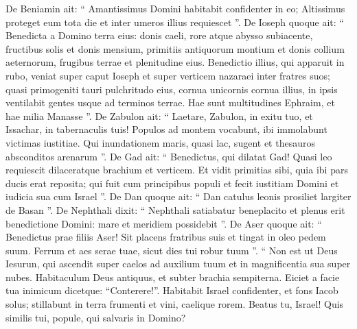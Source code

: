 \begin{biblechapter}
\begin{biblechapter}
\begin{biblechapter}
\begin{biblechapter}
\begin{biblechapter}
\begin{biblechapter}
\begin{biblechapter}
\begin{biblechapter}
\begin{biblechapter}
\begin{biblechapter}
\begin{biblechapter}
\begin{biblechapter}
\begin{biblechapter}
\begin{biblechapter}
\begin{biblechapter}
\begin{biblechapter}
\begin{biblechapter}
\begin{biblechapter}
\begin{biblechapter}
\begin{biblechapter}
\begin{biblechapter}
\begin{biblechapter}
\begin{biblechapter}
\begin{biblechapter}
\begin{biblechapter}
\begin{biblechapter}
\begin{biblechapter}
\begin{biblechapter}
\begin{biblechapter}
\begin{biblechapter}
\begin{biblechapter}
\begin{biblechapter}
\begin{biblechapter}
 \verse De Beniamin ait:
 “ Amantissimus Domini
 habitabit confidenter in eo;
 Altissimus proteget eum tota die
 et inter umeros illius requiescet ”.
 \verse De Ioseph quoque ait:
 “ Benedicta a Domino terra eius:
 donis caeli, rore
 atque abysso subiacente,
 \verse fructibus solis
 et donis mensium,
 \verse primitiis antiquorum montium
 et donis collium aeternorum,
 \verse frugibus terrae et plenitudine eius.
 Benedictio illius, qui apparuit in rubo,
 veniat super caput Ioseph
 et super verticem nazaraei inter fratres suos;
 \verse quasi primogeniti tauri pulchritudo eius,
 cornua unicornis cornua illius,
 in ipsis ventilabit gentes
 usque ad terminos terrae.
 Hae sunt multitudines Ephraim,
 et hae milia Manasse ”.
 \verse De Zabulon ait:
 “ Laetare, Zabulon, in exitu tuo,
 et Issachar, in tabernaculis tuis!
 \verse Populos ad montem vocabunt,
 ibi immolabunt victimas iustitiae.
 Qui inundationem maris, quasi lac, sugent
 et thesauros absconditos arenarum ”.
 \verse De Gad ait:
 “ Benedictus, qui dilatat Gad!
 Quasi leo requiescit
 dilaceratque brachium et verticem.
 \verse Et vidit primitias sibi,
 quia ibi pars ducis erat reposita;
 qui fuit cum principibus populi
 et fecit iustitiam Domini
 et iudicia sua cum Israel ”.
 \verse De Dan quoque ait:
 “ Dan catulus leonis
 prosiliet largiter de Basan ”.
 \verse De Nephthali dixit:
 “ Nephthali satiabatur beneplacito
 et plenus erit benedictione Domini:
 mare et meridiem possidebit ”.
 \verse De Aser quoque ait:
 “ Benedictus prae filiis Aser!
 Sit placens fratribus suis
 et tingat in oleo pedem suum.
 \verse Ferrum et aes serae tuae,
 sicut dies tui robur tuum ”.
 \verse “ Non est ut Deus Iesurun,
 qui ascendit super caelos ad auxilium tuum
 et in magnificentia sua super nubes.
 \verse Habitaculum Deus antiquus,
 et subter brachia sempiterna.
 Eiciet a facie tua inimicum
 dicetque: “Conterere!”.
 \verse Habitabit Israel confidenter,
 et fons Iacob solus;
 stillabunt in terra frumenti et vini,
 caelique rorem.
 \verse Beatus tu, Israel! Quis similis tui,
 popule, qui salvaris in Domino?

\end{biblechapter}
\end{biblechapter}
\end{biblechapter}
\end{biblechapter}
\end{biblechapter}
\end{biblechapter}
\end{biblechapter}
\end{biblechapter}
\end{biblechapter}
\end{biblechapter}
\end{biblechapter}
\end{biblechapter}
\end{biblechapter}
\end{biblechapter}
\end{biblechapter}
\end{biblechapter}
\end{biblechapter}
\end{biblechapter}
\end{biblechapter}
\end{biblechapter}
\end{biblechapter}
\end{biblechapter}
\end{biblechapter}
\end{biblechapter}
\end{biblechapter}
\end{biblechapter}
\end{biblechapter}
\end{biblechapter}
\end{biblechapter}
\end{biblechapter}
\end{biblechapter}
\end{biblechapter}
\end{biblechapter}
